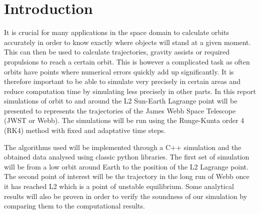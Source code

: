 \section{Introduction}
It is crucial for many applications in the space domain to calculate orbits accurately in order to know exactly where objects will stand at a given moment. This can then be used to calculate trajectories, gravity assists or required propulsions to reach a certain orbit. This is however a complicated task as often orbits have points where numerical errors quickly add up significantly. It is therefore important to be able to simulate very precisely in certain areas and reduce computation time by simulating less precisely in other parts. In this report simulations of orbit to and around the L2 Sun-Earth Lagrange point will be presented to represents the trajectories of the James Webb Space Telescope (JWST or Webb). The simulations will be run using the Runge-Kunta order 4 (RK4) method with fixed and adaptative time steps.

The algorithms used will be implemented through a C++ simulation and the obtained data
analysed using classic python libraries. The first set of simulation will be from a low orbit around Earth to the position of the L2 Lagrange point. The second point of interest will be the trajectory in the long run of Webb once it has reached L2 which is a point of unstable equilibrium. Some analytical results will also be proven in order to verify the soundness of our simulation by comparing them to the computational results.